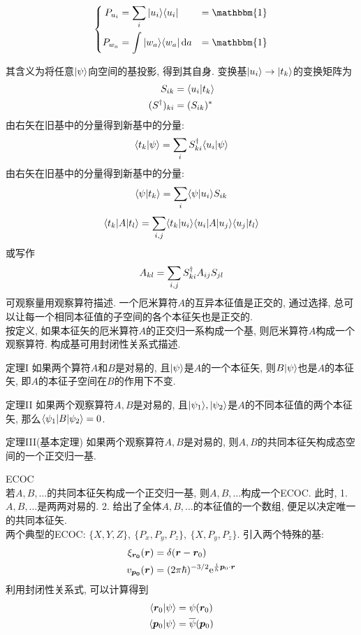 \documentclass[UTF8]{ctexart}
\numberwithin{equation}{subsection}
\newcommand{\nts}[1]{
    \begin{center}
        \begin{notices}{}{}
            #1
        \end{notices}
    \end{center}
}
\begin{document}
\nts{$$\hua{
        P_{u_i}\x \sum_i\kt{u_i}\br{u_i}\x \mathbbm{1}\\
        P_{w_a}\x \int\kt{w_a}\br{w_a}\d a \x \mathbbm{1}\\
    }$$}
其含义为将任意$| {\psi} \rangle$向空间的基投影, 得到其自身. 
变换基$| {u_i} \rangle \to | {t_k} \rangle$的变换矩阵为
$$\begin{aligned} 
    S_{ik}&= \langle {u_i|t_k} \rangle\\
    (S^{\dagger})_{ki}&= (S_{ik})^*
 \end{aligned}$$
由右矢在旧基中的分量得到新基中的分量:
$$\langle {t_k|\psi} \rangle=\sum_i S_{ki}^{\dagger}\langle {u_i|\psi} \rangle$$
由右矢在旧基中的分量得到新基中的分量:
$$\langle {\psi|t_k} \rangle=\sum_i \langle {\psi|u_i} \rangle S_{ik}$$
$$\langle {t_k|A|t_l} \rangle=\sum_{i,j} \langle {t_k|u_i} \rangle\langle {u_i|A|u_j} \rangle\langle {u_j|t_l} \rangle$$
或写作
$$A_{kl}=\sum_{i,j}S^{\dagger}_{ki}A_{ij}S_{jl}$$
可观察量用观察算符描述. 一个厄米算符$A$的互异本征值是正交的, 通过选择, 总可以让每一个相同本征值的子空间的各个本征矢也是正交的. \\
按定义, 如果本征矢的厄米算符$A$的正交归一系构成一个基, 则厄米算符$A$构成一个观察算符. 构成基可用封闭性关系式描述. 
\begin{thm}{定理I}{}
如果两个算符$A$和$B$是对易的, 且$| {\psi} \rangle$是$A$的一个本征矢, 则$B| {\psi} \rangle$也是$A$的本征矢, 即$A$的本征子空间在$B$的作用下不变. 
\end{thm}
\begin{thm}{定理II}{}
如果两个观察算符$A,B$是对易的, 且$| {\psi_1} \rangle,| {\psi_2} \rangle$是$A$的不同本征值的两个本征矢, 那么$\langle {\psi_1|B|\psi_2} \rangle=0$.
\end{thm}
\begin{thm}{定理III(基本定理)}{}
如果两个观察算符$A, B$是对易的, 则$A,B$的共同本征矢构成态空间的一个正交归一基. 
\end{thm}
ECOC\\
若$A, B, \dots$的共同本征矢构成一个正交归一基, 则$A, B, \dots$构成一个ECOC. 此时, 1. $A, B, \dots$是两两对易的. 2. 给出了全体$A, B, \dots$的本征值的一个数组, 便足以决定唯一的共同本征矢. \\
两个典型的ECOC: $\{X,Y,Z\},\ \{P_x,P_y,P_z\},\ \{X,P_y,P_z\}$. 
引入两个特殊的基:
$$\begin{aligned} 
    \xi_{\bm{r_0}}(\bm{r})&=\delta(\bm{r}-\bm{r}_0)\\
    v_{\bm{p_0}}(\bm{r})&= (2\pi\hbar)^{-3/2}\mathrm{e}^{\frac{i}{h}\bm{p}_0\cdot \bm{r}}
 \end{aligned}$$
利用封闭性关系式, 可以计算得到
$$\begin{aligned} 
    \langle {\bm{r}_0|\psi} \rangle &= \psi(\bm{r}_0)\\
    \langle {\bm{p}_0|\psi} \rangle &= \overline{\psi}(\bm{p}_0)\\
 \end{aligned}$$
\end{document}
